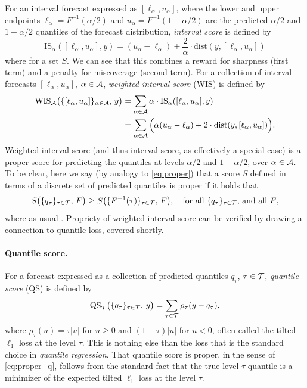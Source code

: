 \documentclass{article}
\begin{document}
For an interval forecast expressed as $[\ell_\alpha, u_\alpha]$, where the lower
and upper endpoints $\ell_\alpha = F^{-1}(\alpha/2)$ and $u_\alpha =
F^{-1}(1-\alpha/2)$ are the predicted $\alpha/2$ and $1-\alpha/2$ quantiles of
the forecast distribution, \emph{interval score} is defined by 
\[
\mathrm{IS}_\alpha( [\ell_\alpha, u_\alpha], y) = 
(u_\alpha - \ell_\alpha) + \frac{2}{\alpha} \cdot
\mathrm{dist}(y, [\ell_\alpha, u_\alpha])
\]
where  for a set $S$. We can
see that this combines a reward for sharpness (first term) and a penalty for 
miscoverage (second term). For a collection of interval forecasts
$[\ell_\alpha, u_\alpha]$, $\alpha \in \mathcal{A}$, \emph{weighted interval score}
(WIS) is defined by
\begin{align}
\nonumber
\mathrm{WIS}_{\mathcal{A}} \big( \{[\ell_\alpha, u_\alpha]\}_{\alpha \in \mathcal{A}}, \, y \big)  
&= \sum_{\alpha \in \mathcal{A}} \alpha \cdot \mathrm{IS}_\alpha( [\ell_\alpha,
  u_\alpha], y) \\
\label{eq:wis}
&=\sum_{\alpha \in \mathcal{A}} \Big(\alpha (u_\alpha - \ell_\alpha) + 2 \cdot
  \mathrm{dist}(y, [\ell_\alpha, u_\alpha]) \Big).
\end{align}
Weighted interval score (and thus interval score, as effectively a special case)
is a proper score for predicting the quantiles at levels $\alpha/2$ and
$1-\alpha/2$, over $\alpha \in \mathcal{A}$. To be clear, here we say (by analogy to 
\eqref{eq:proper}) that a score $S$ defined in terms of a discrete set of
predicted quantiles  is proper if it holds
that    
\begin{equation}
\label{eq:proper_q}
S \big( \{q_\tau\}_{\tau \in \mathcal{T}}, \, F \big) \geq S \big(
\{F^{-1}(\tau)\}_{\tau \in \mathcal{T}}, \, F \big), \quad \text{for all
$\{q_\tau\}_{\tau \in \mathcal{T}}$, and all $F$},    
\end{equation}
where as usual . Propriety of weighted interval score  
can be verified by drawing a connection to quantile loss, covered shortly.  

\paragraph{Quantile score.}

For a forecast expressed as a collection of predicted quantiles $q_\tau$, $\tau
\in \mathcal{T}$, \emph{quantile score} (QS) is defined by 
\begin{equation}
\label{eq:qs}
\mathrm{QS}_{\mathcal{T}} \big( \{q_\tau\}_{\tau \in \mathcal{T}}, \, y \big) = 
\sum_{\tau \in \mathcal{T}} \rho_\tau(y - q_\tau),
\end{equation}
where $\rho_\tau(u) = \tau |u|$ for $u \geq 0$ and $(1-\tau) |u|$ for $u < 0$,
often called the tilted $\ell_1$ loss at the level $\tau$. This is nothing else
than the loss that is the standard choice in \emph{quantile regression}. That
quantile score is proper, in the sense of \eqref{eq:proper_q}, follows from the
standard fact that the true level $\tau$ quantile is a minimizer of the expected
tilted $\ell_1$ loss at the level $\tau$.
\end{document}
